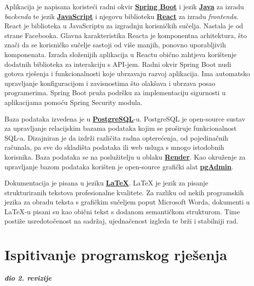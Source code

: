 			 Aplikacija je napisana koristeći radni okvir \textbf{\href{https://spring.io/projects/spring-boot}{Spring Boot}} i jezik 
			 \textbf{\href{https://www.java.com/en/}{Java}} za izradu \textit{backenda} te jezik \textbf{\href{https://www.javascript.com/}{JavaScript}} 
			 i njegovu biblioteku \textbf{\href{https://react.dev/}{React}} za izradu \textit{frontenda}. React je biblioteka 
			 u JavaScriptu za izgradnju korisničkih sučelja. Nastala je od strane Facebooka. Glavna karakteristika Reacta je komponentna 
			 arhitektura, što znači da se korisničko sučelje sastoji od više manjih, ponovno uporabljivih komponenata. Izrada 
			 složenijih aplikacija u Reactu obično zahtjeva korištenje dodatnih biblioteka za interakciju s API-jem. Radni okvir 
			 Spring Boot nudi gotova rješenja i funkcionalnosti koje ubrzavaju razvoj aplikacija. Ima automatsko upravljanje 
			 konfiguracijom i zavisnostima što olakšava i ubrzava posao programerima. Spring Boot pruža podršku za implementaciju 
			 sigurnosti u aplikacijama pomoću Spring Security modula. 

			 Baza podataka izvedena je u \textbf{\href{https://www.postgresql.org/}{PostgreSQL}}-u. PostgreSQL je open-source sustav za upravljanje relacijskim bazama
			 podataka kojim se proširuje funkcionalnost SQL-a. Dizajniran je da izdrži različita radna opterećenja, od 
			 pojedinačnih računala, pa sve do skladišta podataka ili web usluga s mnogo istodobnih korisnika. Baza podataka
			 se na poslužitelju u oblaku \textbf{\href{https://render.com/}{Render}}. Kao okruženje za upravljanje bazom
			 podataka korišten je open-source grafički alat \textbf{\href{https://www.pgadmin.org/}{pgAdmin}}.

		     Dokumentacija je pisana u jeziku \textbf{\href{https://www.latex-project.org/}{LaTeX}}. LaTeX je jezik za pisanje
			 strukturiranih tekstova profesionalne kvalitete. Za razliku od nekih programskih jezika za obradu teksta s grafičkim
			 sučeljem poput Microsoft Worda, dokumenti u LaTeX-u pisani su kao obični tekst s dodanom semantičkom strukturom. Time 
			 postiže usredotočenost na sadržaj, ujednačenost izgleda te brži i stabilniji rad.

			\eject 
		
	
		\section{Ispitivanje programskog rješenja}
			
			\textbf{\textit{dio 2. revizije}}\\
			
